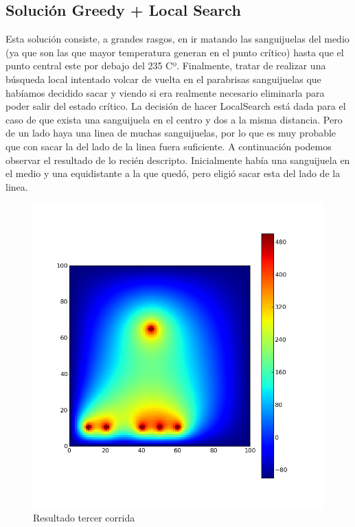 \subsection{Solución Greedy + Local Search}
Esta solución consiste, a grandes rasgos, en ir matando las sanguijuelas del medio (ya que son las que mayor temperatura generan en el punto crítico) hasta que el punto central este por debajo del 235 Cº. Finalmente, tratar de realizar una búsqueda local intentado volcar de vuelta en el parabrisas sanguijuelas que habíamos decidido sacar y viendo si era realmente necesario eliminarla para poder salir del estado crítico. La decisión de hacer LocalSearch está dada para el caso de que exista una sanguijuela en el centro y dos a la misma distancia. Pero de un lado haya una linea de muchas sanguijuelas, por lo que es muy probable que con sacar la del lado de la linea fuera suficiente. A continuación podemos observar el resultado de lo recién descripto. Inicialmente había una sanguijuela en el medio y una equidistante a la que quedó, pero eligió sacar esta del lado de la linea.

\begin{figure}[htb]
\begin{center}
\includegraphics[scale=0.50]{imagenes/greedy_corrido.png} 
\caption{Resultado tercer corrida} 
\end{center}
\end{figure}

